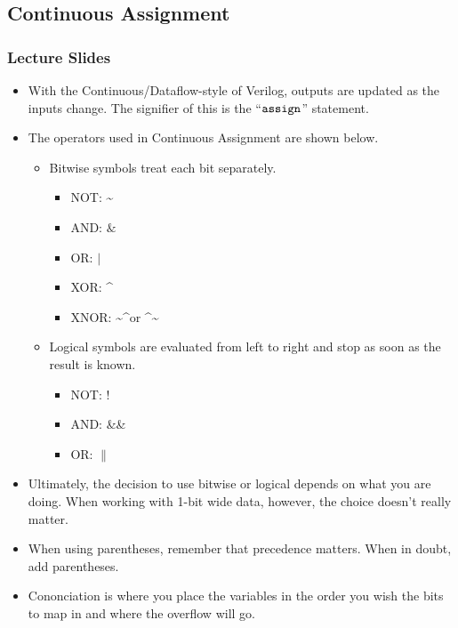 \documentclass[10pt,a4paper]{article}
\begin{document}
\subsection{Continuous Assignment}
\subsubsection{Lecture Slides}
\begin{itemize}
\item With the Continuous/Dataflow-style of Verilog, outputs are updated as the inputs change. The signifier of this is the ``$\tt{assign}$'' statement.
\item The operators used in Continuous Assignment are shown below.
\begin{itemize}
\item Bitwise symbols treat each bit separately. 
\begin{itemize}
\item NOT: \textasciitilde
\item AND: $\&$
\item OR: $|$
\item XOR: \textasciicircum
\item XNOR: \textasciitilde\textasciicircum or \textasciicircum\textasciitilde
\end{itemize}
\item Logical symbols are evaluated from left to right and stop as soon as the result is known.
\begin{itemize}
\item NOT: !
\item AND: \&\&
\item OR: $\|$
\end{itemize}
\end{itemize}
\item Ultimately, the decision to use bitwise or logical depends on what you are doing. When working with 1-bit wide data, however, the choice doesn't really matter.
\item When using parentheses, remember that precedence matters. When in doubt, add parentheses.
\item Cononciation is where you place the variables in the order you wish the bits to map in and where the overflow will go.  
\end{itemize}
\end{document}
